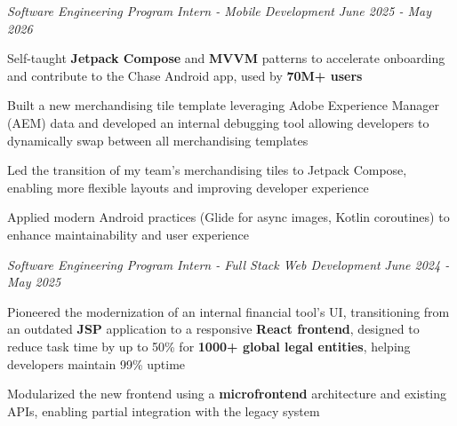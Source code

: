 \documentclass[letterpaper]{article}
\begin{document}
    \textit{Software Engineering Program Intern - Mobile Development} \hfill \textsl{June 2025 - May 2026}\\
    \vspace{-7pt}
    \begin{tightitemize} \itemsep -1mm

            \item Self-taught \textbf{Jetpack Compose} and \textbf{MVVM} patterns to accelerate onboarding and contribute to the Chase Android app, used by \textbf{70M+ users}
            
            \item Built a new merchandising tile template leveraging Adobe Experience Manager (AEM) data and developed an internal debugging tool allowing developers to dynamically swap between all merchandising templates
            
            \item Led the transition of my team's merchandising tiles to Jetpack Compose, enabling more flexible layouts and improving developer experience
            
            \item Applied modern Android practices (Glide for async images, Kotlin coroutines) to enhance maintainability and user experience
                 
    \end{tightitemize}
    \textit{Software Engineering Program Intern - Full Stack Web Development} \hfill \textsl{June 2024 - May 2025}\\
    \vspace{-7pt}
    \begin{tightitemize} \itemsep -1mm

            \item Pioneered the modernization of an internal financial tool’s UI, transitioning from an outdated \textbf{JSP} application to a responsive \textbf{React frontend}, designed to reduce task time by up to 50\% for \textbf{1000+ global legal entities}, helping developers maintain 99\% uptime

            \item Modularized the new frontend using a \textbf{microfrontend} architecture and existing APIs, enabling partial integration with the legacy system
                    
    \end{tightitemize}
    \vspace{-2mm}
\end{document}
